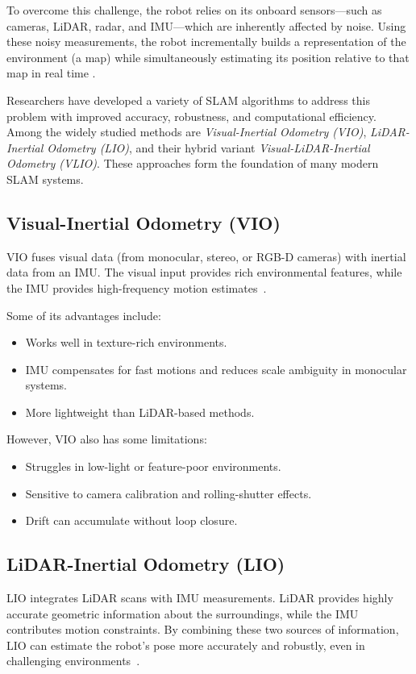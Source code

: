 \documentclass[english, bachelor, utf8]{base/thesis_telematics}
\begin{document}
To overcome this challenge, the robot relies on its onboard sensors---such as cameras, LiDAR, radar, and IMU---which are inherently affected by noise. 
Using these noisy measurements, the robot incrementally builds a representation of the environment (a map) while simultaneously estimating its position relative to that map in real time \cite{slam_problem}. 

Researchers have developed a variety of SLAM algorithms to address this problem with improved accuracy, robustness, and computational efficiency.
Among the widely studied methods are \textit{Visual-Inertial Odometry (VIO)}, \textit{LiDAR-Inertial Odometry (LIO)}, and their hybrid variant \textit{Visual-LiDAR-Inertial Odometry (VLIO)}. 
These approaches form the foundation of many modern SLAM systems.
\subsection{Visual-Inertial Odometry (VIO)}
VIO fuses visual data (from monocular, stereo, or RGB-D cameras) with inertial data from an IMU. 
The visual input provides rich environmental features, while the IMU provides high-frequency motion estimates~\cite{inertiallabs_vio_revolution,Survey_odometry}.

Some of its advantages include:
\begin{itemize}
    \item Works well in texture-rich environments.
    \item IMU compensates for fast motions and reduces scale ambiguity in monocular systems.
    \item More lightweight than LiDAR-based methods.
\end{itemize}

However, VIO also has some limitations:
\begin{itemize}
    \item Struggles in low-light or feature-poor environments.
    \item Sensitive to camera calibration and rolling-shutter effects.
    \item Drift can accumulate without loop closure.
\end{itemize}

\subsection{LiDAR-Inertial Odometry (LIO)}
LIO integrates LiDAR scans with IMU measurements. LiDAR provides highly accurate geometric information about the surroundings, while the IMU contributes motion constraints.
By combining these two sources of information, LIO can estimate the robot's pose more accurately and robustly, even in challenging environments~\cite{lee2024_lidar_odometry_survey,fastlio2}.
\end{document}
